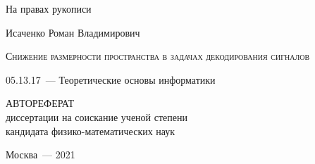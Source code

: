 \documentclass[11pt, a5paper]{dissert}
\begin{document}
\begin{titlepage}
	\begin{flushright}
		{На правах рукописи}
	\end{flushright}
	\vspace{3.5cm}
	\begin{center}
		{Исаченко Роман Владимирович}
		\par
		\vspace{3cm}
		\textsc{Снижение размерности пространства в задачах декодирования сигналов}
		\par
		\vspace{2cm}
		{05.13.17~--- Теоретические основы информатики}
		\par
		\vspace{2cm}
		{АВТОРЕФЕРАТ\\
		диссертации на соискание ученой степени\\
		кандидата физико-математических наук}
	\end{center}
	\par
	\vspace{3.5cm}
	\begin{center}
		{Москва~--- 2021}
	\end{center}
\end{titlepage}


\setcounter{page}{2}
\end{document}
